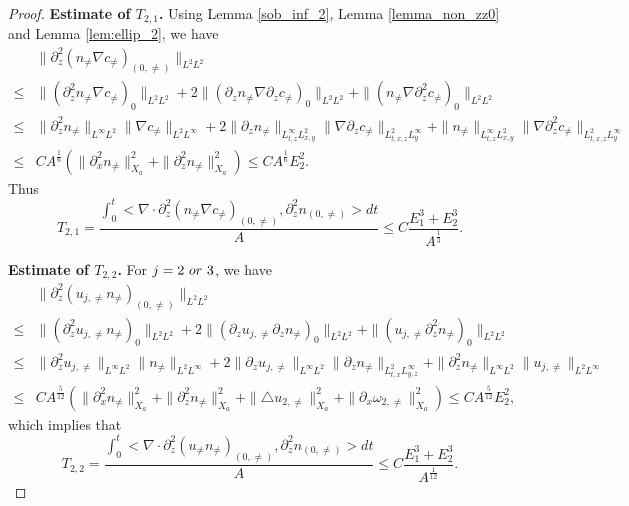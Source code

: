 \documentclass[12pt, reqno]{amsart}
\numberwithin{equation}{section}
\begin{document}
\begin{proof}
		{\bf Estimate of $T_{2,1}$.} 
		Using Lemma \ref{sob_inf_2}, Lemma \ref{lemma_non_zz0} 
		and Lemma \ref{lem:ellip_2}, we have
		\begin{equation*}
			\begin{aligned}
				&\|\partial_z^2(n_{\neq}\nabla c_{\neq})_{(0,\neq)}\|_{L^2L^2}\\
				\leq 
				&\|(\partial_z^2n_{\neq}\nabla c_{\neq})_{0}\|_{L^2L^2}+
				2\|(\partial_zn_{\neq}\nabla \partial_zc_{\neq})_{0}\|_{L^2L^2}+
				\|(n_{\neq}\nabla \partial_z^2c_{\neq})_{0}\|_{L^2L^2}\\
				\leq&\|\partial_z^2n_{\neq}\|_{L^{\infty}L^2}
				\|\nabla c_{\neq}\|_{L^2L^{\infty}}
				+2\|\partial_zn_{\neq}\|_{L^{\infty}_{t,z}L^2_{x,y}}
				\|\nabla\partial_zc_{\neq}\|_{L^2_{t,x,z}L^{\infty}_{y}}
				+\|n_{\neq}\|_{L^{\infty}_{t,z}L^2_{x,y}}
				\|\nabla\partial_z^2c_{\neq}\|_{L^2_{t,x,z}L^{\infty}_{y}}\\
				\leq &CA^{\frac16}(\|\partial_x^2n_{\neq}\|_{X_a}^2
				+\|\partial_z^2n_{\neq}\|_{X_a}^2)\leq CA^{\frac16}E_2^2.
			\end{aligned}
		\end{equation*}
		Thus
		\begin{equation*}
			T_{2,1}=\frac{\int_0^t<\nabla\cdot\partial_z^2(n_{\neq}\nabla c_{\neq})_{(0,\neq)},\partial_z^2 n_{(0,\neq)}>dt}{A}\leq C\frac{E_1^3+E_2^3}{A^{\frac13}}.
		\end{equation*}
		
		{\bf Estimate of $T_{2,2}$.} 
		For $j=2~{\rm or}~3$, we  have 
		\begin{equation*}
			\begin{aligned}
				&\|\partial_z^2(u_{j,\neq} n_{\neq})_{(0,\neq)}\|_{L^2L^2}\\
				\leq 
				&\|(\partial_z^2u_{j,\neq} n_{\neq})_{0}\|_{L^2L^2}+
				2\|(\partial_zu_{j,\neq} \partial_zn_{\neq})_{0}\|_{L^2L^2}+	\|(u_{j,\neq} \partial_z^2n_{\neq})_{0}\|_{L^2L^2}\\
				\leq
				&\|\partial_z^2u_{j,\neq}\|_{L^{\infty}L^2}
				\|n_{\neq}\|_{L^2L^{\infty}}+
				2\|\partial_zu_{j,\neq}\|_{L^{\infty}L^2}
				\|\partial_zn_{\neq}\|_{L^2_{t,x}L^{\infty}_{y,z}}
				+\|\partial_z^2n_{\neq}\|_{L^{\infty}L^2}
				\|u_{j,\neq}\|_{L^2L^{\infty}}\\
				\leq &CA^{\frac{5}{12}}(\|\partial_x^2n_{\neq}\|_{X_a}^2
				+\|\partial_z^2n_{\neq}\|_{X_a}^2+\|\triangle u_{2,\neq}\|^2_{X_a}
				+\| \partial_x\omega_{2,\neq}\|^2_{X_a})
				\leq CA^{\frac{5}{12}}E_2^2,
			\end{aligned}
		\end{equation*}
		which implies that 
		\begin{equation*}
			T_{2,2}
			=\frac{\int_0^t<\nabla\cdot
				\partial_z^2(u_{\neq}n_{\neq})_{(0,\neq)},
				\partial_z^2 n_{(0,\neq)}>dt}{A}\leq C\frac{E_1^3+E_2^3}{A^{\frac{1}{12}}}.
		\end{equation*}
		

\end{proof}
\end{document}
